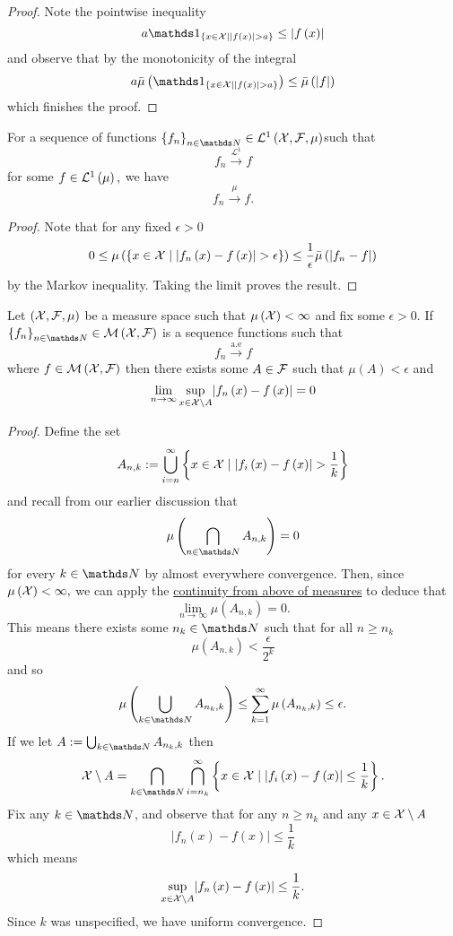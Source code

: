 \begin{proof}
Note the pointwise inequality
\[
a\indicate_{\left\{ x\in\X\mid\lvert f\left(x\right)\rvert>a\right\} }\leq\lvert f\left(x\right)\rvert
\]
and observe that by the monotonicity of the integral
\[
a\lebInt{\mu}{\indicate_{\{x\in\X\mid\lvert f\left(x\right)\rvert>a\}}}\leq\lebInt{\mu}{\lvert f\rvert}
\]
which finishes the proof.
\end{proof}
\begin{prop}
\label{prop:L1impliesConvergenceInMeasure}For a sequence of functions
$\left\{ f_{n}\right\} _{n\in\N}\in\Lp 1{\X,\F,\mu}$such that 
\[
f_{n}\stackrel{\mathcal{L}^{1}}{\longrightarrow}f
\]
for some $f\in\mathcal{L}^{1}\left(\mu\right),$ we have 
\[
f_{n}\stackrel{\mu}{\longrightarrow}f.
\]
\end{prop}

\begin{proof}
Note that for any fixed $\epsilon>0$
\[
0\leq\mu\left(\left\{ x\in\mathcal{X}\mid\lvert f_{n}\left(x\right)-f\left(x\right)\rvert>\epsilon\right\} \right)\leq\frac{1}{\epsilon}\bar{\mu}\left(\lvert f_{n}-f\rvert\right)
\]
by the Markov inequality. Taking the limit proves the result.
\end{proof}
\begin{thm}
\label{thm:egorovTheorem}Let $\left(\mathcal{X},\mathcal{F},\mu\right)$ be a measure
space such that $\mu\left(\mathcal{X}\right)<\infty$ and fix some $\epsilon>0$.
If $\left\{ f_{n}\right\} _{n\in\N}\in\measurableFunctions$ is a
sequence functions such that
\[
f_{n}\stackrel{\text{a.e}}{\longrightarrow}f
\]
where $f\in\mathcal{M}\left(\mathcal{X},\mathcal{F}\right)$ then there exists some $A\in\mathcal{F}$
such that $\mu\left(A\right)<\epsilon$ and 
\[
\lim_{n\to\infty}\sup_{x\in\mathcal{X}\setminus A}\lvert f_{n}\left(x\right)-f\left(x\right)\rvert=0
\]
\end{thm}

\begin{proof}
Define the set 
\[
A_{n,k}:=\bigcup_{i=n}^{\infty}\left\{ x\in\mathcal{X}\mid\lvert f_{i}\left(x\right)-f\left(x\right)\rvert>\frac{1}{k}\right\} 
\]
and recall from our earlier discussion that 
\[
\mu\left(\bigcap_{n\in\N}A_{n,k}\right)=0
\]
for every $k\in\N$ by almost everywhere convergence. Then, since
$\mu\left(\mathcal{X}\right)<\infty,$ we can apply the \hyperref[prop:equivalenceContinuityMeasures]{continuity from above of measures}
to deduce that 
\[
\lim_{n\to\infty}\mu\left(A_{n,k}\right)=0.
\]
This means there exists some $n_{k}\in\N$ such that for all $n\geq n_{k}$
\[
\mu\left(A_{n,k}\right)<\frac{\epsilon}{2^{k}}
\]
and so
\[
\mu\left(\bigcup_{k\in\N}A_{n_{k},k}\right)\leq\sum_{k=1}^{\infty}\mu\left(A_{n_{k},k}\right)\leq\epsilon.
\]
If we let $A:=\bigcup_{k\in\N}A_{n_{k},k}$ then
\[
\X\setminus A=\bigcap_{k\in\N}\bigcap_{i=n_{k}}^{\infty}\left\{ x\in\X\mid\left\lvert f_{i}\left(x\right)-f\left(x\right)\right\rvert \leq\frac{1}{k}\right\} .
\]
Fix any $k\in\N$, and observe that for any $n\geq n_{k}$ and any
$x\in\mathcal{X}\setminus A$
\[
\lvert f_{n}\left(x\right)-f\left(x\right)\rvert\leq\frac{1}{k}
\]
which means 
\[
\sup_{x\in\mathcal{X}\setminus A}\lvert f_{n}\left(x\right)-f\left(x\right)\rvert\leq\frac{1}{k}.
\]
Since $k$ was unspecified, we have uniform convergence.
\end{proof}

